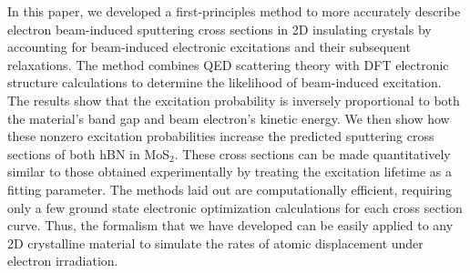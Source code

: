 \documentclass{article}
\begin{document}
In this paper, we developed a first-principles method to more accurately
describe electron beam-induced sputtering cross sections in 2D insulating
crystals by accounting for beam-induced electronic excitations and their
subsequent relaxations.
The method combines QED scattering theory with DFT electronic structure
calculations to determine the likelihood of beam-induced excitation.
The results show that the excitation probability is inversely proportional
to both the material's band gap and beam electron's kinetic energy.
We then show how these nonzero excitation probabilities increase the predicted
sputtering cross sections of both hBN in MoS$_2$.  These cross sections can be
made quantitatively similar to those obtained experimentally by treating the
excitation lifetime as a fitting parameter.
The methods laid out are computationally efficient, requiring only a few
ground state electronic optimization calculations for each cross section curve.
Thus, the formalism that we have developed can be easily applied to any 2D
crystalline material to simulate the rates of atomic displacement under
electron irradiation.
\end{document}
